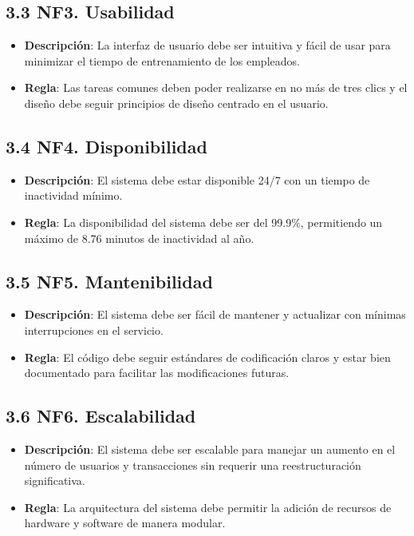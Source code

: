 \documentclass{article}
\begin{document}
\subsection{3.3 NF3. Usabilidad}
\begin{itemize}
    \item \textbf{Descripción}: La interfaz de usuario debe ser intuitiva y fácil de usar para minimizar el tiempo de entrenamiento de los empleados.
    \item \textbf{Regla}: Las tareas comunes deben poder realizarse en no más de tres clics y el diseño debe seguir principios de diseño centrado en el usuario.
\end{itemize}

\subsection{3.4 NF4. Disponibilidad}
\begin{itemize}
    \item \textbf{Descripción}: El sistema debe estar disponible 24/7 con un tiempo de inactividad mínimo.
    \item \textbf{Regla}: La disponibilidad del sistema debe ser del 99.9\%, permitiendo un máximo de 8.76 minutos de inactividad al año.
\end{itemize}

\subsection{3.5 NF5. Mantenibilidad}
\begin{itemize}
    \item \textbf{Descripción}: El sistema debe ser fácil de mantener y actualizar con mínimas interrupciones en el servicio.
    \item \textbf{Regla}: El código debe seguir estándares de codificación claros y estar bien documentado para facilitar las modificaciones futuras.
\end{itemize}

\subsection{3.6 NF6. Escalabilidad}
\begin{itemize}
    \item \textbf{Descripción}: El sistema debe ser escalable para manejar un aumento en el número de usuarios y transacciones sin requerir una reestructuración significativa.
    \item \textbf{Regla}: La arquitectura del sistema debe permitir la adición de recursos de hardware y software de manera modular.
\end{itemize}
\end{document}
